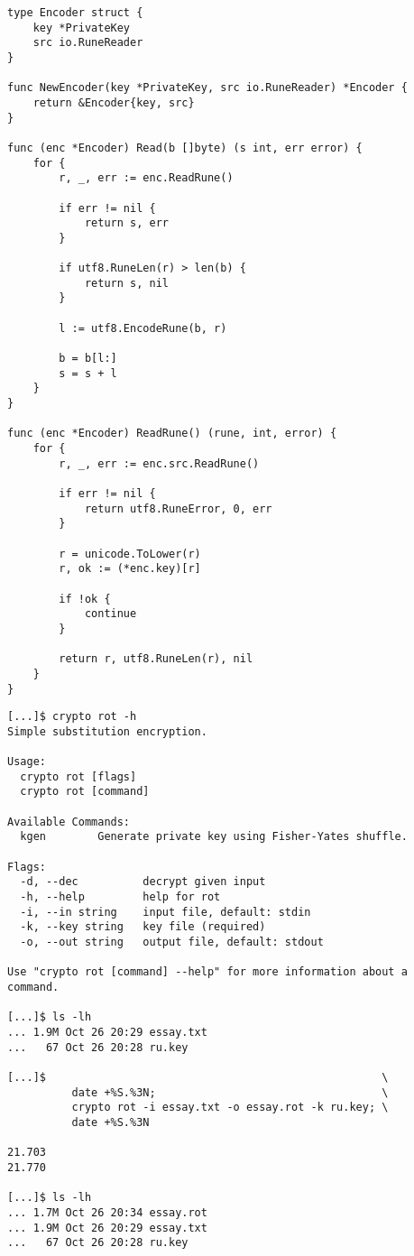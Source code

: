 \documentclass[12pt, a4paper]{article}
\begin{document}
\begin{verbatim}
type Encoder struct {
	key *PrivateKey
	src io.RuneReader
}

func NewEncoder(key *PrivateKey, src io.RuneReader) *Encoder {
	return &Encoder{key, src}
}

func (enc *Encoder) Read(b []byte) (s int, err error) {
	for {
		r, _, err := enc.ReadRune()

		if err != nil {
			return s, err
		}

		if utf8.RuneLen(r) > len(b) {
			return s, nil
		}

		l := utf8.EncodeRune(b, r)

		b = b[l:]
		s = s + l
	}
}

func (enc *Encoder) ReadRune() (rune, int, error) {
	for {
		r, _, err := enc.src.ReadRune()

		if err != nil {
			return utf8.RuneError, 0, err
		}

		r = unicode.ToLower(r)
		r, ok := (*enc.key)[r]

		if !ok {
			continue
		}

		return r, utf8.RuneLen(r), nil
	}
}
\end{verbatim}

\begin{verbatim}
[...]$ crypto rot -h
Simple substitution encryption.

Usage:
  crypto rot [flags]
  crypto rot [command]

Available Commands:
  kgen        Generate private key using Fisher-Yates shuffle.

Flags:
  -d, --dec          decrypt given input
  -h, --help         help for rot
  -i, --in string    input file, default: stdin
  -k, --key string   key file (required)
  -o, --out string   output file, default: stdout

Use "crypto rot [command] --help" for more information about a command.

[...]$ ls -lh
... 1.9M Oct 26 20:29 essay.txt
...   67 Oct 26 20:28 ru.key

[...]$                                                    \
          date +%S.%3N;                                   \
          crypto rot -i essay.txt -o essay.rot -k ru.key; \
          date +%S.%3N

21.703
21.770

[...]$ ls -lh
... 1.7M Oct 26 20:34 essay.rot
... 1.9M Oct 26 20:29 essay.txt
...   67 Oct 26 20:28 ru.key
\end{verbatim}
\end{document}
